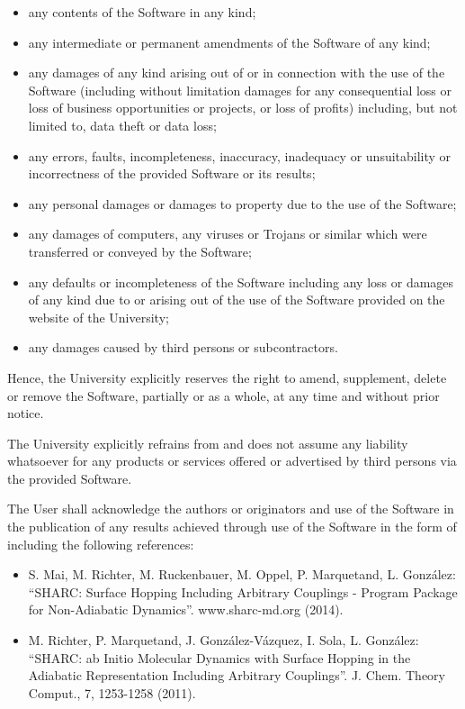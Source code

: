 \documentclass[a4paper,11pt,DIV=15,openany,twoside=false]{scrbook}
\begin{document}
{\begin{shaded}
\begin{itemize}
  \item any contents of the Software in any kind;
  \item any intermediate or permanent amendments of the Software of any kind;
  \item any damages of any kind arising out of or in connection with the use of the Software (including without limitation damages for any consequential loss or loss of business opportunities or projects, or loss of profits) including, but not limited to, data theft or data loss;
  \item any errors, faults, incompleteness, inaccuracy, inadequacy or unsuitability or incorrectness of the provided Software or its results;
  \item any personal damages or damages to property due to the use of the Software;
  \item any damages of computers, any viruses or Trojans or similar which were transferred or conveyed by the Software;
  \item any defaults or incompleteness of the Software including any loss or damages of any kind due to or arising out of the use of the Software provided on the website of the University;
  \item any damages caused by third persons or subcontractors.
\end{itemize}

Hence, the University explicitly reserves the right to amend, supplement, delete or remove the Software, partially or as a whole, at any time and without prior notice.

The University explicitly refrains from and does not assume any liability whatsoever for any products or services offered or advertised by third persons via the provided Software.


The User shall acknowledge the authors or originators and use of the Software in the publication of any results achieved through use of the Software in the form of including the following references:

\begin{itemize}
  \item S. Mai, M. Richter, M. Ruckenbauer, M. Oppel, P. Marquetand, L. Gonz\'alez: ``SHARC: Surface Hopping Including Arbitrary Couplings - Program Package for Non-Adiabatic Dynamics''. www.sharc-md.org (2014).
  \item M. Richter, P. Marquetand, J. Gonz\'alez-V\'azquez, I. Sola, L. Gonz\'alez: ``SHARC: ab Initio Molecular Dynamics with Surface Hopping in the Adiabatic Representation Including Arbitrary Couplings''. J. Chem. Theory Comput., 7, 1253-1258 (2011).
\end{itemize}


\end{shaded}}
\end{document}
